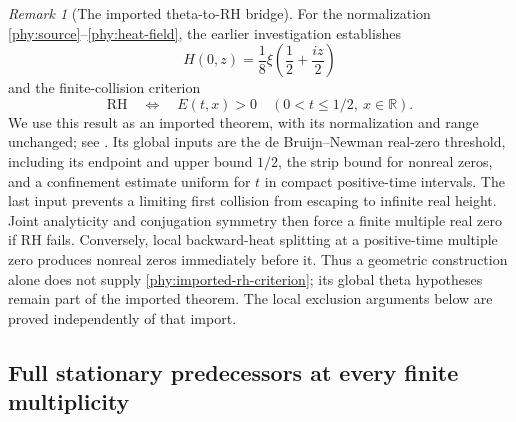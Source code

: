 \documentclass[11pt]{article}
\numberwithin{equation}{section}
\theoremstyle{definition}
\theoremstyle{remark}
\newtheorem{remark}[theorem]{Remark}
\begin{document}
\begin{remark}[The imported theta-to-RH bridge]
\label{phy:imported-bridge}
For the normalization \eqref{phy:source}--\eqref{phy:heat-field}, the earlier
investigation establishes
\[
 H(0,z)=\frac18\xi\!\left(\frac12+\frac{iz}{2}\right)
\]
and the finite-collision criterion
\begin{equation}
 \mathrm{RH}\quad\Longleftrightarrow\quad
 E(t,x)>0\quad(0<t\le1/2,\ x\in\mathbb R).
 \label{phy:imported-rh-criterion}
\end{equation}
We use this result as an imported theorem, with its normalization and
range unchanged; see \cite[section on positive-time collisions]{BakerTheta}.
Its global inputs are the de Bruijn--Newman real-zero threshold, including
its endpoint and upper bound $1/2$, the strip bound for nonreal zeros, and
a confinement estimate uniform for $t$ in compact positive-time intervals.
The last input prevents a limiting first collision from escaping to
infinite real height.  Joint analyticity and conjugation symmetry then
force a finite multiple real zero if RH fails.  Conversely, local
backward-heat splitting at a positive-time multiple zero produces nonreal
zeros immediately before it.  Thus a geometric construction alone does
not supply \eqref{phy:imported-rh-criterion}; its global theta hypotheses
remain part of the imported theorem.  The local exclusion arguments below
are proved independently of that import.
\end{remark}

\subsection{Full stationary predecessors at every finite multiplicity}
\label{phy:predecessors}
\end{document}
